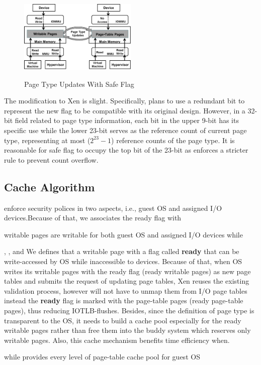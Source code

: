 \begin{figure}[ht]
\centering
\includegraphics[width=0.5\textwidth]{image/background/wr2pt.png} \\
\caption{Page Type Updates With Safe Flag}
\label{fig:safe-flag}
\end{figure}

The modification to Xen is slight. Specifically, \name plans to use a redundant bit to represent the new flag to be compatible with its original design. However, in a 32-bit field related to page type information, each bit in the upper 9-bit has its specific use while the lower 23-bit serves as the reference count of current page type, representing at most ($2^23-1$) reference counts of the page type. It is reasonable for safe flag to occupy the top bit of the 23-bit as \name enforces a stricter rule to prevent count overflow.

\subsection{Cache Algorithm}



enforce security polices in two aspects, i.e., guest OS and assigned I/O devices.Because of that, we associates the ready flag with

writable pages are writable for both guest OS and assigned I/O devices while

, , and  We defines that a writable page with a flag called \textbf{ready} that can be write-accessed by OS while inaccessible to devices. Because of that, when OS writes its writable pages with the ready flag (ready writable pages) as new page tables and submits the request of updating page tables, Xen reuses the existing validation process, however will not have to unmap them from I/O page tables instead the \textbf{ready} flag is marked with the page-table pages (ready page-table pages), thus reducing IOTLB-flushes. Besides, since the definition of page type is transparent to the OS, it needs to build a cache pool especially for the ready writable pages rather than free them into the buddy system which reserves only writable pages. Also, this cache mechanism benefits time efficiency when.

while provides every level of page-table cache pool for guest OS
